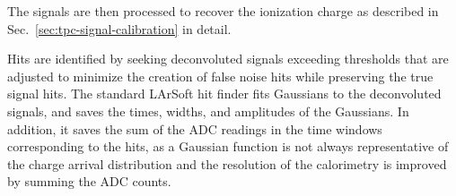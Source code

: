The %
 signals are then processed to recover the ionization charge
as described in Sec.~\ref{sec:tpc-signal-calibration} in detail. 
%

%
Hits are identified by seeking deconvoluted signals exceeding
thresholds that are adjusted to minimize the creation of false noise
hits while preserving the true signal hits.  The standard LArSoft hit
finder fits Gaussians to the deconvoluted signals, and saves the
times, widths, and amplitudes of the Gaussians.  In addition, it saves the sum of
the ADC readings in the time windows corresponding to the hits, as a
Gaussian function is not always representative of the charge arrival
distribution and the resolution of the calorimetry is improved by
summing the ADC counts.

